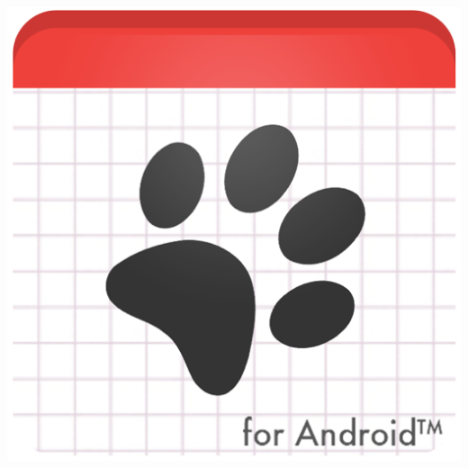 \documentclass[14pt]{beamer}
\begin{document}
\begin{frame}
\begin{itemize}
\includegraphics[scale =0.09]{Images/DogH.png}

\end{itemize}
\end{frame}
\end{document}

